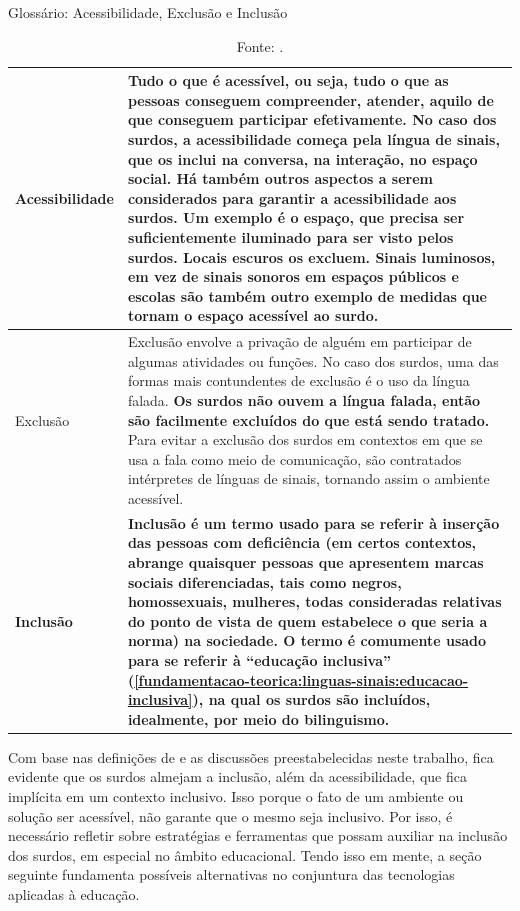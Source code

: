 \begin{table}[htbp]
\caption{Glossário: Acessibilidade, Exclusão e Inclusão}
\label{tab:glossario:acessibilidade-exclusao-inclusao}
\begin{tabularx}{\textwidth}{l|X} \hline
Acessibilidade &  Tudo o que é acessível, ou seja, tudo o que as pessoas conseguem compreender, atender, aquilo de que conseguem participar efetivamente. \textbf{No caso dos surdos, a acessibilidade começa pela língua de sinais, que os inclui na conversa, na interação, no espaço social.} Há também outros aspectos a serem considerados para garantir a acessibilidade aos surdos. Um exemplo é o espaço, que precisa ser suficientemente iluminado para ser visto pelos surdos. Locais escuros os excluem. Sinais luminosos, em vez de sinais sonoros em espaços públicos e escolas são também outro exemplo de medidas que tornam o espaço acessível ao surdo.\\ \hline
Exclusão & Exclusão envolve a privação de alguém em participar de algumas atividades ou funções. No caso dos surdos, uma das formas mais contundentes de exclusão é o uso da língua falada. \textbf{Os surdos não ouvem a língua falada, então são facilmente excluídos do que está sendo tratado.} Para evitar a exclusão dos surdos em contextos em que se usa a fala como meio de comunicação, são contratados intérpretes de línguas de sinais, tornando assim o ambiente acessível. \\ \hline
\textbf{Inclusão} & \textbf{Inclusão é um termo usado para se referir à inserção das pessoas com deficiência (em certos contextos, abrange quaisquer pessoas que apresentem marcas sociais diferenciadas, tais como negros, homossexuais, mulheres, todas consideradas relativas do ponto de vista de quem estabelece o que seria a norma) na sociedade. O termo é comumente usado para se referir à ``educação inclusiva'' (\autoref{fundamentacao-teorica:linguas-sinais:educacao-inclusiva}), na qual os surdos são incluídos, idealmente, por meio do bilinguismo.} \\ \hline
\end{tabularx}
\caption*{Fonte: .}
\end{table}

Com base nas definições de  e as discussões preestabelecidas neste trabalho, fica evidente que os surdos almejam a inclusão, além da acessibilidade, que fica implícita em um contexto inclusivo. Isso porque o fato de um ambiente ou solução ser acessível, não garante que o mesmo seja inclusivo. Por isso, é necessário refletir sobre estratégias e ferramentas que possam auxiliar na inclusão dos surdos, em especial no âmbito educacional. Tendo isso em mente, a seção seguinte fundamenta possíveis alternativas no conjuntura das tecnologias aplicadas à educação.

